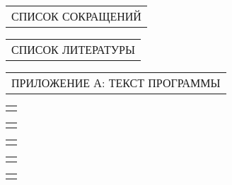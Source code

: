 \documentclass[12pt, А4, twoside]{article}
\begin{document}
\begin{FlushLeft}
		\vspace{-0.1 cm}
		
		\begin{tabular}{p{17.25cm}}
			\hspace{0.3cm} \textsf{СПИСОК СОКРАЩЕНИЙ} \vspace{0pt} \hline \\
		\end{tabular}
		
		\vspace{-0.1 cm}
		
		\begin{tabular}{p{17.25cm}}
			\hspace{0.3cm} \textsf{СПИСОК ЛИТЕРАТУРЫ} \vspace{0pt} \hline \\
		\end{tabular}
		
		\vspace{-0.1 cm}
		
		\begin{tabular}{p{17.25cm}}
			\hspace{0.3cm} \textsf{ПРИЛОЖЕНИЕ А: ТЕКСТ ПРОГРАММЫ} \vspace{0pt} \hline  \\
		\end{tabular}
		
		
		\begin{tabular}{p{17.25cm}}
			\vspace{0pt} \hline \\
		\end{tabular}
		
		\begin{tabular}{p{17.25cm}}
			\vspace{0pt} \hline \\
		\end{tabular}
		
		\begin{tabular}{p{17.25cm}}
			\vspace{0pt} \hline \\
		\end{tabular}
		
		\begin{tabular}{p{17.25cm}}
			\vspace{0pt} \hline \\
		\end{tabular}
		
		\begin{tabular}{p{17.25cm}}
			\vspace{0pt} \hline \\
		\end{tabular}
		

\end{FlushLeft}
\end{document}

